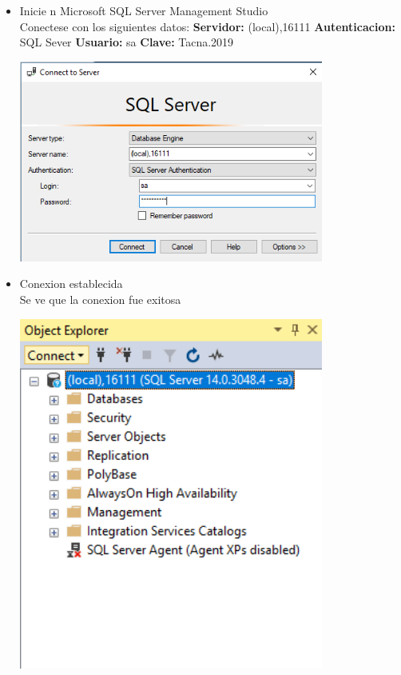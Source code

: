 \begin{itemize}
	\item Inicie n Microsoft SQL Server Management Studio 
	\\Conectese con los siguientes datos: \textbf{Servidor:}  (local),16111 \textbf{Autenticacion:} SQL Sever \textbf{Usuario:} sa \textbf{Clave:} Tacna.2019

	\begin{center}
	\includegraphics[width=10cm]{./Imagenes/10} 
	\end{center}

\end{itemize} 

\begin{itemize}
	\item Conexion establecida
	\\ Se ve que la conexion fue exitosa

	\begin{center}
	\includegraphics[width=10cm]{./Imagenes/11} 
	\end{center}

\end{itemize} 

